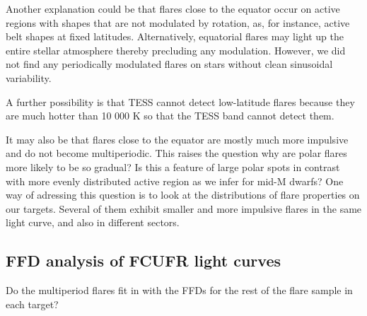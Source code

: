 \documentclass[fleqn,usenatbib,letters]{mnras}%
\begin{document}
Another explanation could be that flares close to the equator occur on active regions with shapes that are not modulated by rotation, as, for instance, active belt shapes at fixed latitudes. Alternatively, equatorial flares may light up the entire stellar atmosphere thereby precluding any modulation. However, we did not find any periodically modulated flares on stars without clean sinusoidal variability.

A further possibility is that TESS cannot detect low-latitude flares because they are much hotter than 10 000 K so that the TESS band cannot detect them.

It may also be that flares close to the equator are mostly much more impulsive and do not become multiperiodic. This raises the question why are polar flares more likely to be so gradual? Is this a feature of large polar spots in contrast with more evenly distributed active region as we infer for mid-M dwarfs? One way of adressing this question is to look at the distributions of flare properties on our targets. Several of them exhibit smaller and more impulsive flares in the same light curve, and also in different sectors.
\subsection{FFD analysis of FCUFR light curves}

Do the multiperiod flares fit in with the FFDs for the rest of the flare sample in each target?
\end{document}
